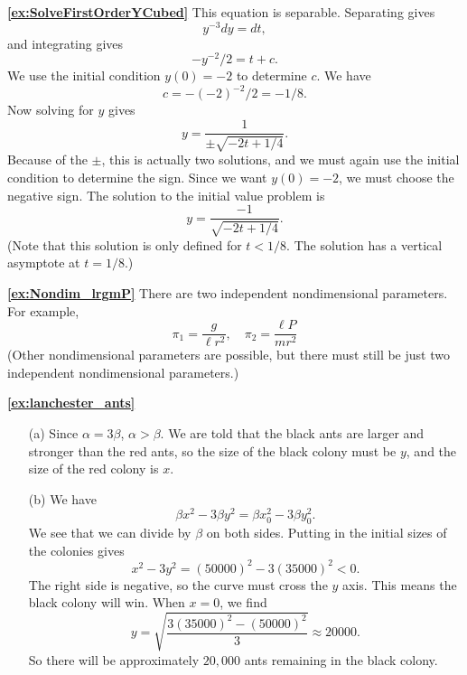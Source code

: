 \documentclass[reqno]{immbook}
\numberwithin{equation}{chapter}
\numberwithin{question}{section}
\numberwithin{theorem}{chapter}
\numberwithin{figure}{chapter}
\theoremstyle{definition}
\begin{document}
\medskip
\textbf{\ref{ex:SolveFirstOrderYCubed}}
This equation is separable.  Separating gives
\[
   y^{-3}dy = dt,
\]
and integrating gives
\[
  -y^{-2}/2 = t + c.
\]
We use the initial condition $y(0)=-2$ to determine $c$.
We have
\[
  c = -(-2)^{-2}/2 = -1/8.
\]
Now solving for $y$ gives
\[
  y = \frac{1}{\pm\sqrt{-2t+1/4}}.
\]
Because of the $\pm$, this is actually two solutions, and we must again use
the initial condition to determine the sign.  Since we want $y(0)=-2$, we must
choose the negative sign.  The solution to the initial value problem is
\[
  y = \frac{-1}{\sqrt{-2t+1/4}}.
\]
(Note that this solution is only defined for $t < 1/8$.  The
solution has a vertical asymptote at $t=1/8$.)

\medskip
\textbf{\ref{ex:Nondim_lrgmP}}
There are two independent nondimensional parameters.
For example,
\[
   \pi_1 = \frac{g}{\ell r^2}, \quad \pi_2 = \frac{\ell P}{mr^2}
\]
(Other nondimensional parameters are possible, but there
must still be just two independent nondimensional parameters.)


\newpage
\textbf{\ref{ex:lanchester_ants}}
\begin{enumerate}
\item[(a)] Since $\alpha = 3\beta$, $\alpha > \beta$.
We are told that the black ants are larger and stronger than
the red ants, so the size of the black colony must be $y$,
and the size of the red colony is $x$.
\item[(b)] We have
\[
   \beta x^2 - 3\beta y^2 = \beta x_0^2 -3\beta y_0^2.
\]
We see that we can divide by $\beta$ on both sides.
Putting in the initial sizes of the colonies gives
\[
   x^2-3y^2 = (50000)^2-3(35000)^2 < 0.
\]
The right side is negative, so the curve must cross the $y$
axis. This means the black colony will win.
  When $x=0$, we find
\[
  y = \sqrt{\frac{3(35000)^2-(50000)^2}{3}} \approx 20000.
\]
So there will be approximately $20,000$ ants remaining in
the black colony.
\end{enumerate}
\end{document}
